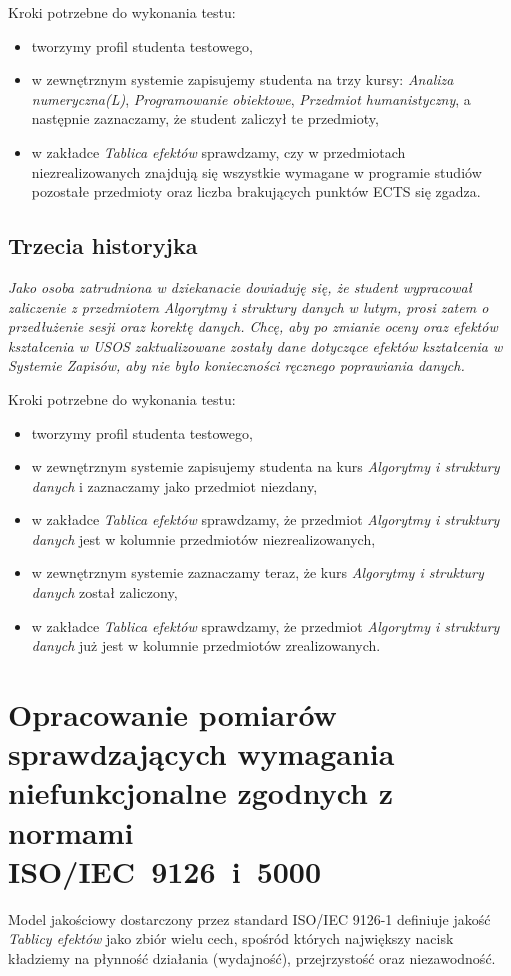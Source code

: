 \documentclass{article}
\begin{document}
\medskip
\noindent Kroki potrzebne do wykonania testu:
\begin{itemize}
 \item tworzymy profil studenta testowego,
 \item w zewnętrznym systemie zapisujemy studenta na trzy kursy: \textit{Analiza numeryczna(L)}, \textit{Programowanie obiektowe}, \textit{Przedmiot humanistyczny}, a następnie zaznaczamy, że student zaliczył te przedmioty,
 \item w zakładce \textit{Tablica efektów} sprawdzamy, czy w przedmiotach niezrealizowanych znajdują się wszystkie wymagane w programie studiów pozostałe przedmioty oraz
 liczba brakujących punktów ECTS się zgadza.
\end{itemize}

\subsection{Trzecia historyjka}
\textit{Jako osoba zatrudniona w dziekanacie dowiaduję się, że student wypracował zaliczenie z przedmiotem \textnormal{Algorytmy i struktury danych} w lutym, prosi zatem o przedłużenie sesji oraz korektę danych. 
Chcę, aby po zmianie oceny oraz efektów kształcenia w USOS zaktualizowane zostały dane dotyczące efektów kształcenia w Systemie Zapisów, aby nie było konieczności ręcznego poprawiania danych.}

\medskip
\noindent Kroki potrzebne do wykonania testu:
\begin{itemize}
 \item tworzymy profil studenta testowego,
 \item w zewnętrznym systemie zapisujemy studenta na kurs \textit{Algorytmy i struktury danych} i zaznaczamy jako przedmiot niezdany,
 \item w zakładce \textit{Tablica efektów} sprawdzamy, że przedmiot \textit{Algorytmy i struktury danych} jest w kolumnie przedmiotów niezrealizowanych,
 \item w zewnętrznym systemie zaznaczamy teraz, że kurs \textit{Algorytmy i struktury danych} został zaliczony,
 \item w zakładce \textit{Tablica efektów} sprawdzamy, że przedmiot \textit{Algorytmy i struktury danych} już jest w kolumnie przedmiotów zrealizowanych.
\end{itemize}

\section{Opracowanie pomiarów sprawdzających wymagania niefunkcjonalne zgodnych z normami \\ISO/IEC~9126~i~5000}
Model jakościowy dostarczony przez standard ISO/IEC 9126-1 definiuje jakość \textit{Tablicy efektów} jako zbiór wielu cech, spośród których największy nacisk kładziemy na płynność działania (wydajność), przejrzystość oraz niezawodność.
\end{document}
